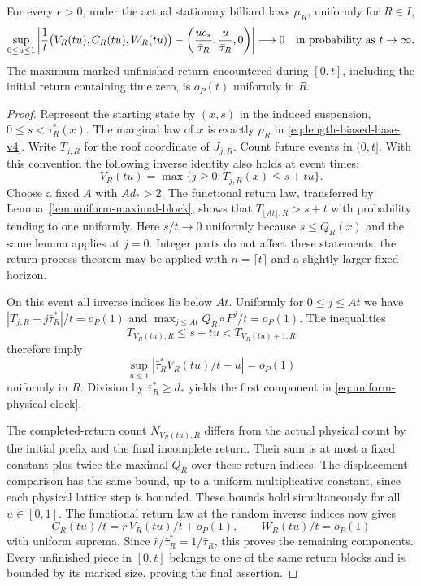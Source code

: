 \begin{theorem}
\label{thm:uniform-physical-clock}
For every $\epsilon>0$, under the actual stationary billiard laws
$\mu_R$, uniformly for $R\in I$,
\begin{equation}\label{eq:uniform-physical-clock}
 \sup_{0\le u\le1}\left|
 \frac1t\bigl(V_R(tu),C_R(tu),W_R(tu)\bigr)
 -\left(\frac{uc_*}{\bar\tau_R},
        \frac{u}{\bar\tau_R},0\right)\right|
 \longrightarrow0
 \quad\hbox{in probability as }t\to\infty.
\end{equation}
The maximum marked unfinished return encountered during $[0,t]$,
including the initial return containing time zero, is $o_P(t)$
uniformly in $R$.
\end{theorem}
\begin{proof}
Represent the starting state by $(x,s)$ in the induced suspension,
$0\le s<\tau_R^*(x)$. The marginal law of $x$ is exactly $\rho_R$
in \eqref{eq:length-biased-base-v4}. Write $T_{j,R}$ for the roof
coordinate of $J_{j,R}$. Count future events in $(0,t]$. With this
convention the following inverse identity also holds at event times:
\[
 V_R(tu)=\max\{j\ge0:T_{j,R}(x)\le s+tu\}.
\]
Choose a fixed $A$ with $A d_*>2$. The functional return law,
transferred by Lemma~\ref{lem:uniform-maximal-block}, shows that
$T_{\lfloor At\rfloor,R}>s+t$ with probability tending to one
uniformly. Here $s/t\to0$ uniformly because $s\le Q_R(x)$ and
the same lemma applies at $j=0$. Integer parts do not affect these
statements; the return-process theorem may be applied with
$n=\lceil t\rceil$ and a slightly larger fixed horizon.

On this event all inverse indices lie below $At$. Uniformly for
$0\le j\le At$ we have
$|T_{j,R}-j\bar\tau_R^*|/t=o_P(1)$ and
$\max_{j\le At}Q_R\circ F^j/t=o_P(1)$. The inequalities
\[
 T_{V_R(tu),R}\le s+tu<T_{V_R(tu)+1,R}
\]
therefore imply
\[
 \sup_{u\le1}\left|
 \bar\tau_R^* V_R(tu)/t-u\right|=o_P(1)
\]
uniformly in $R$. Division by $\bar\tau_R^*\ge d_*$ yields the
first component in \eqref{eq:uniform-physical-clock}.

The completed-return count $N_{V_R(tu),R}$ differs from the actual
physical count by the initial prefix and the final incomplete return.
Their sum is at most a fixed constant plus twice the maximal $Q_R$
over these return indices. The displacement comparison has the same
bound, up to a uniform multiplicative constant, since each physical
lattice step is bounded. These bounds hold simultaneously for all
$u\in[0,1]$. The functional return law at the random inverse indices
now gives
\[
 C_R(tu)/t=\bar r\,V_R(tu)/t+o_P(1),\qquad
 W_R(tu)/t=o_P(1)
\]
with uniform suprema. Since $\bar r/\bar\tau_R^*=1/\bar\tau_R$,
this proves the remaining components. Every unfinished piece in
$[0,t]$ belongs to one of the same return blocks and is bounded by
its marked size, proving the final assertion.
\end{proof}

